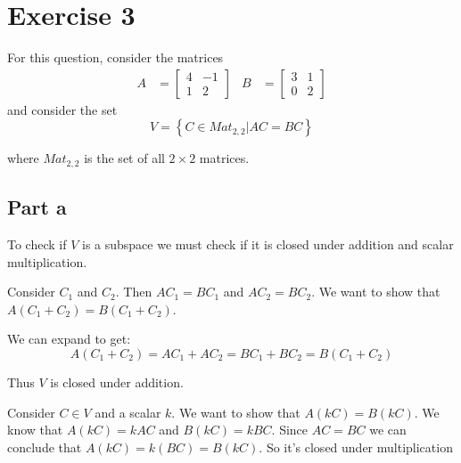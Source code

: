 \section{Exercise 3}
For this question, consider the matrices
\begin{align*}
	A & = \begin{bmatrix}
		      4 & -1 \\
		      1 & 2
	      \end{bmatrix} &
	B & = \begin{bmatrix}
		      3 & 1 \\
		      0 & 2
	      \end{bmatrix}
\end{align*}
and consider the set
\[
	V = \left\{C\in Mat_{2,2} | AC=BC\right\}
\]

where $Mat_{2,2}$ is the set of all $2\times 2$ matrices.

\subsection{Part a}

To check if $V$ is a subspace we must check if it is closed under addition and scalar multiplication.

Consider $C_1$ and $C_2$. Then $AC_1 = BC_1$ and $AC_2 = BC_2$. We want to show that $A(C_1 + C_2) = B(C_1 + C_2)$.

We can expand to get:
\[
	A(C_1 + C_2) = AC_1 + AC_2 = BC_1 + BC_2 = B(C_1 + C_2)
\]

Thus $V$ is closed under addition.

Consider $C\in V$ and a scalar $k$. We want to show that $A(kC) = B(kC)$.
We know that $A(kC) = kAC$ and $B(kC) = kBC$. Since $AC = BC$ we can conclude that $A(kC) = k(BC) = B(kC)$. So it's closed under multiplication
